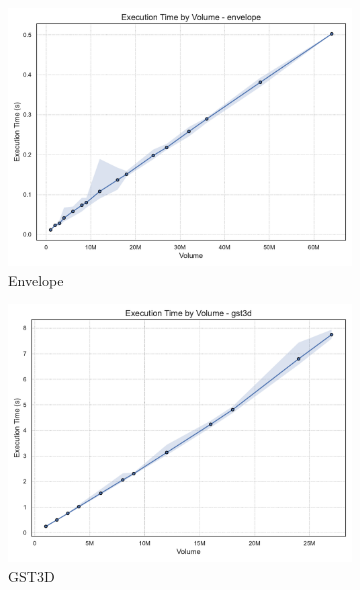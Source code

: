 \begin{figure}[htbp]
    \centering
    \begin{subfigure}[t]{0.32\textwidth}
        \includegraphics[width=\textwidth]{assets/images/05/execution_time_by_volume_envelope}
        \caption{Envelope}
    \end{subfigure}
    \hfill
    \begin{subfigure}[t]{0.32\textwidth}
        \includegraphics[width=\textwidth]{assets/images/05/execution_time_by_volume_gst3d}
        \caption{\ac{GST3D}}
    \end{subfigure}
    \hfill
    \begin{subfigure}[t]{0.32\textwidth}

\end{subfigure}
\end{figure}
